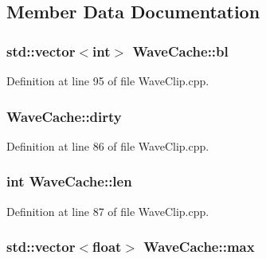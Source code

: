 \subsection{Member Data Documentation}
\subsubsection[{\texorpdfstring{bl}{bl}}]{\setlength{\rightskip}{0pt plus 5cm}std\+::vector$<${\bf int}$>$ Wave\+Cache\+::bl}\hypertarget{class_wave_cache_a122c1153962ae8d4b5e12810f2867bf0}{}\label{class_wave_cache_a122c1153962ae8d4b5e12810f2867bf0}


Definition at line 95 of file Wave\+Clip.\+cpp.

\subsubsection[{\texorpdfstring{dirty}{dirty}}]{ Wave\+Cache\+::dirty}\hypertarget{class_wave_cache_abee5a8da780defb99cfab2cb9608b618}{}\label{class_wave_cache_abee5a8da780defb99cfab2cb9608b618}


Definition at line 86 of file Wave\+Clip.\+cpp.

\subsubsection[{\texorpdfstring{len}{len}}]{ {\bf int} Wave\+Cache\+::len}\hypertarget{class_wave_cache_aadcb69c211509b3de0105d521dd50b9c}{}\label{class_wave_cache_aadcb69c211509b3de0105d521dd50b9c}


Definition at line 87 of file Wave\+Clip.\+cpp.

\subsubsection[{\texorpdfstring{max}{max}}]{\setlength{\rightskip}{0pt plus 5cm}std\+::vector$<$float$>$ Wave\+Cache\+::max}\hypertarget{class_wave_cache_a38026831cc4f78f4ff5b2cc2c2b264cc}{}\label{class_wave_cache_a38026831cc4f78f4ff5b2cc2c2b264cc}



